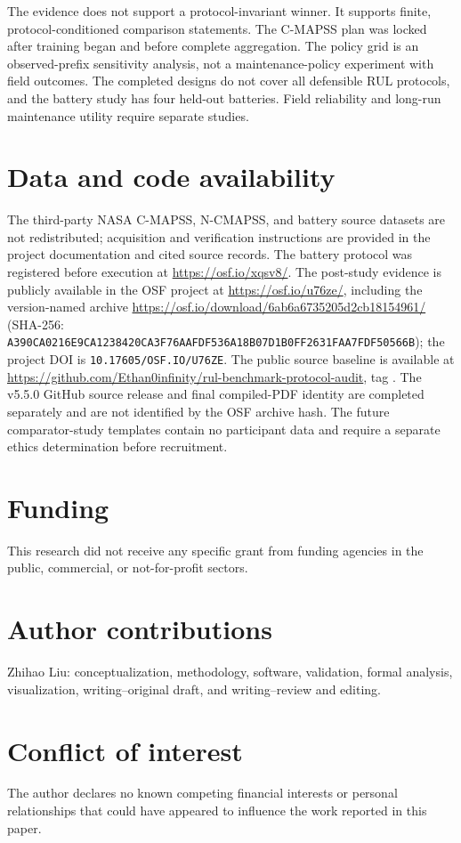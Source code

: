 \documentclass[preprint,12pt,numbers,sort&compress]{elsarticle}
\begin{document}
The evidence does not support a protocol-invariant winner. It supports finite, protocol-conditioned comparison statements. The C-MAPSS plan was locked after training began and before complete aggregation. The policy grid is an observed-prefix sensitivity analysis, not a maintenance-policy experiment with field outcomes. The completed designs do not cover all defensible RUL protocols, and the battery study has four held-out batteries. Field reliability and long-run maintenance utility require separate studies.

\section*{Data and code availability}
The third-party NASA C-MAPSS, N-CMAPSS, and battery source datasets are not redistributed; acquisition and verification instructions are provided in the project documentation and cited source records. The battery protocol was registered before execution at \url{https://osf.io/xqsv8/}. The post-study evidence is publicly available in the OSF project at \url{https://osf.io/u76ze/}, including the version-named archive \url{https://osf.io/download/6ab6a6735205d2cb18154961/} (SHA-256: \nolinkurl{A390CA0216E9CA1238420CA3F76AAFDF536A18B07D1B0FF2631FAA7FDF50566B}); the project DOI is \nolinkurl{10.17605/OSF.IO/U76ZE}. The public source baseline is available at \url{https://github.com/Ethan0infinity/rul-benchmark-protocol-audit}, tag \texttt{\EvidenceSourceReleaseTag}. The v5.5.0 GitHub source release and final compiled-PDF identity are completed separately and are not identified by the OSF archive hash. The future comparator-study templates contain no participant data and require a separate ethics determination before recruitment.

\section*{Funding}
This research did not receive any specific grant from funding agencies in the public, commercial, or not-for-profit sectors.

\section*{Author contributions}
Zhihao Liu: conceptualization, methodology, software, validation, formal analysis, visualization, writing--original draft, and writing--review and editing.

\section*{Conflict of interest}
The author declares no known competing financial interests or personal relationships that could have appeared to influence the work reported in this paper.
\end{document}
